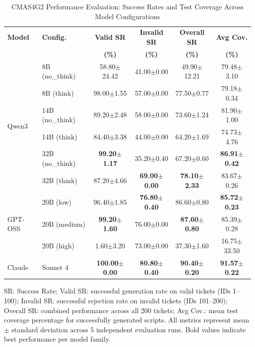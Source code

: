 \documentclass[runningheads]{llncs}
\begin{document}
\begin{table}[htbp]
\centering
\caption{CMAS4G2 Performance Evaluation: Success Rates and Test Coverage Across Model Configurations}
\label{tab:cmas4g2_performance}
\small
\setlength{\tabcolsep}{3pt}
\begin{tabular}{@{}llcccc@{}}
\toprule
\textbf{Model} & \textbf{Config.} & \textbf{Valid SR} & \textbf{Invalid SR} & \textbf{Overall SR} & \textbf{Avg Cov.} \\
 & & \textbf{(\%)} & \textbf{(\%)} & \textbf{(\%)} & \textbf{(\%)} \\
\midrule
\multirow{6}{*}{Qwen3} & 8B (no\_think) & 58.80$\pm$24.42 & 41.00$\pm$0.00 & 49.90$\pm$12.21 & 79.48$\pm$3.10 \\
 & 8B (think) & 98.00$\pm$1.55 & 57.00$\pm$0.00 & 77.50$\pm$0.77 & 79.18$\pm$0.34 \\
 & 14B (no\_think) & 89.20$\pm$2.48 & 58.00$\pm$0.00 & 73.60$\pm$1.24 & 81.90$\pm$1.00 \\
 & 14B (think) & 84.40$\pm$3.38 & 44.00$\pm$0.00 & 64.20$\pm$1.69 & 74.73$\pm$4.76 \\
 & 32B (no\_think) & \textbf{99.20$\pm$1.17} & 35.20$\pm$0.40 & 67.20$\pm$0.60 & \textbf{86.91$\pm$0.42} \\
 & 32B (think) & 87.20$\pm$4.66 & \textbf{69.00$\pm$0.00} & \textbf{78.10$\pm$2.33} & 83.67$\pm$0.26 \\
\midrule
\multirow{3}{*}{GPT-OSS} & 20B (low) & 96.40$\pm$1.85 & \textbf{76.80$\pm$0.40} & 86.60$\pm$0.80 & \textbf{85.72$\pm$0.23} \\
 & 20B (medium) & \textbf{99.20$\pm$1.60} & 76.00$\pm$0.00 & \textbf{87.60$\pm$0.80} & 85.39$\pm$0.28 \\
 & 20B (high) & 1.60$\pm$3.20 & 73.00$\pm$0.00 & 37.30$\pm$1.60 & 16.75$\pm$33.50 \\
\midrule
Claude & Sonnet 4 & \textbf{100.00$\pm$0.00} & \textbf{80.80$\pm$0.40} & \textbf{90.40$\pm$0.20} & \textbf{91.57$\pm$0.22} \\
\bottomrule
\end{tabular}
\vspace{4pt}
\noindent\footnotesize
SR: Success Rate; Valid SR: successful generation rate on valid tickets (IDs 1--100); Invalid SR: successful rejection rate on invalid tickets (IDs 101--200); Overall SR: combined performance across all 200 tickets; Avg Cov.: mean test coverage percentage for successfully generated scripts. All metrics represent mean $\pm$ standard deviation across 5 independent evaluation runs. Bold values indicate best performance per model family.
\end{table}
\end{document}

